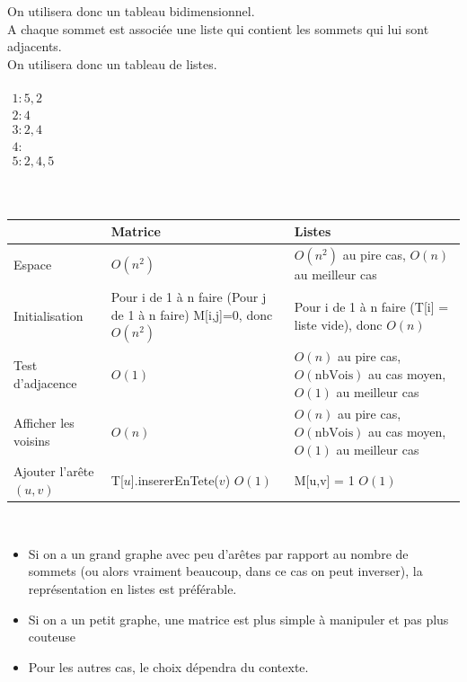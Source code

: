 On utilisera donc un tableau bidimensionnel. \\

 A chaque sommet est associée une liste qui contient les sommets qui lui sont adjacents. \\

On utilisera donc un tableau de listes.  \\

\\
$\begin{array}{l}
	1 : 5,2 \\
	2 : 4 \\
	3 : 2,4 \\
	4 : \\
	5 : 2,4,5 \\
\end{array}$ \newpage

 \\
\begin{tabular}{l|p{4cm}|p{4cm}}
	& Matrice & Listes \\ \hline
Espace & $O(n^2)$ & $O(n^2)$ au pire cas, $O(n)$ au meilleur cas \\ \hline
Initialisation & Pour i de 1 à n faire (Pour j de 1 à n faire) M[i,j]=0, donc $O(n^2)$ & Pour i de 1 à n faire (T[i] = liste vide), donc $O(n)$ \\ \hline
Test d'adjacence & $O(1)$ & $O(n)$ au pire cas, $O(\mathrm{nbVois})$ au cas moyen, $O(1)$ au meilleur cas \\ \hline
Afficher les voisins & $O(n)$ & $O(n)$ au pire cas, $O(\mathrm{nbVois})$ au cas moyen, $O(1)$ au meilleur cas \\ \hline
Ajouter l'arête $(u,v)$ & T[$u$].insererEnTete($v$) $O(1)$ & M[u,v] = 1 $O(1)$ \\ \hline
\end{tabular} \\

\begin{itemize}
	\item Si on a un grand graphe avec peu d'arêtes par rapport au nombre de sommets (ou alors vraiment beaucoup, dans ce cas on peut inverser), la représentation en listes est préférable.
	\item Si on a un petit graphe, une matrice est plus simple à manipuler et pas plus couteuse
	\item Pour les autres cas, le choix dépendra du contexte.
\end{itemize}
